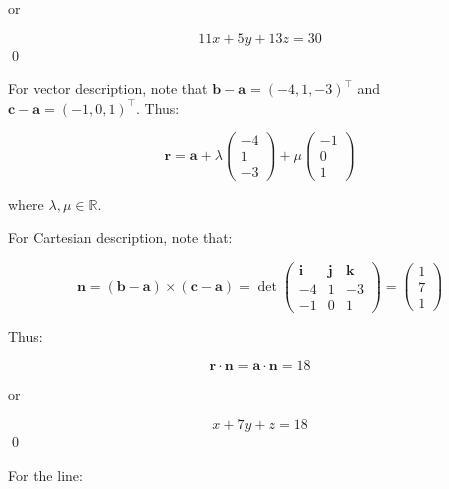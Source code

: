 \documentclass[12pt]{article}
\begin{document}
or

\begin{equation}
    11x + 5y + 13z = 30
\end{equation}
\qed


For vector description, note that $\mathbf{b} - \mathbf{a} = (-4, 1, -3)^{\intercal}$ and $\mathbf{c} - \mathbf{a} = (-1, 0, 1)^{\intercal}$. Thus:

\begin{equation}
    \mathbf{r} = \mathbf{a} +
    \lambda \begin{pmatrix}
        -4 \\
        1  \\
        -3
    \end{pmatrix}
    +
    \mu \begin{pmatrix}
        -1 \\
        0  \\
        1
    \end{pmatrix}
\end{equation}

where $\lambda, \mu \in \mathbb{R}$.

For Cartesian description, note that:

\begin{equation}
    \mathbf{n} = (\mathbf{b} - \mathbf{a}) \times (\mathbf{c} - \mathbf{a}) =
    \det{
        \begin{pmatrix}
            \mathbf{i} & \mathbf{j} & \mathbf{k} \\
            -4         & 1          & -3         \\
            -1         & 0          & 1
        \end{pmatrix}}
    =
    \begin{pmatrix}
        1 \\
        7 \\
        1
    \end{pmatrix}
\end{equation}

Thus:

\begin{equation}
    \mathbf{r} \cdot \mathbf{n} = \mathbf{a} \cdot \mathbf{n} = 18
\end{equation}

or

\begin{equation}
    x + 7y + z = 18
\end{equation}
\qed


For the line:
\end{document}
